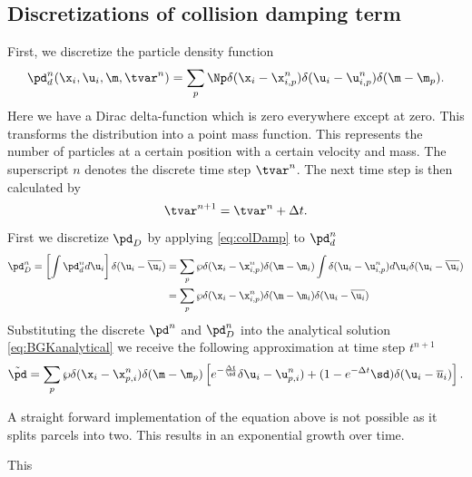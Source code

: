 \subsection{Discretizations of collision damping term}
First, we discretize the particle density function \pd 
\begin{equation}
    \pd_d^n (\x_i, \u_i, \m, \tvar^n) = \sum_{p} \Np \delta (\x_i - \x_{i,p}^n) \delta(\u_i - \u_{i,p}^n) \delta (\m - \m_p).
\end{equation}
Here we have a Dirac delta-function which is zero everywhere except at zero. This transforms the distribution into a point mass function. This represents the number of particles at a certain position with a certain velocity and mass. 
The superscript $n$ denotes the discrete time step $\tvar^n$.
The next time step is then calculated by
\begin{equation}
    \tvar^{n+1} = \tvar^n + \Delta t.
\end{equation}
First we discretize $\pd_D$ by applying \eqref{eq:colDamp} to $\pd_d^n$
\begin{align}
    \pd_D^n = \left[ \int \pd_d^n d \u_i\right] \delta (\u_i - \overline{\u_i}) &= \sum_p \wp \delta (\x_{i} - \x_{i,p}^n) \delta (\m - \m_i) \int \delta (\u_i - \u_{i,p}^n) d \u_i \delta (\u_i - \overline{\u_i}) \\ &= \sum_p \wp \delta (\x_i - \x_{i,p}^n) \delta (\m - \m_i) \delta (\u_i - \overline{\u_i})
\end{align}
Substituting the discrete $\pd^n$ and $\pd^n_D$ into the analytical solution \eqref{eq:BGKanalytical} we receive the following approximation at time step $t^{n+1}$\begin{equation}
    \Tilde{\pd} = \sum_{p} \wp \delta (\x_i - \x_{p,i}^n) \delta (\m - \m_p ) \left[ e^{- \frac{\Delta t}{\sd}} \delta \u_i - \u_{p,i}^n ) + (1- e^{- \Delta t}{\sd}) \delta (\u_i - \overline{u}_i) \right].
\end{equation}

A straight forward implementation of the equation above is not possible as it splits parcels into two. This results in an exponential growth over time. 

This
\color{black}